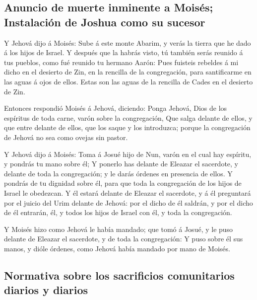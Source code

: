 \hypertarget{anuncio-de-muerte-inminente-a-moisuxe9s-instalaciuxf3n-de-joshua-como-su-sucesor}{%
\subsection{Anuncio de muerte inminente a Moisés; Instalación de Joshua
como su
sucesor}\label{anuncio-de-muerte-inminente-a-moisuxe9s-instalaciuxf3n-de-joshua-como-su-sucesor}}

 Y Jehová dijo á Moisés: Sube á este monte Abarim, y verás
la tierra que he dado á los hijos de Israel.  Y después que
la habrás visto, tú también serás reunido á tus pueblos, como fué
reunido tu hermano Aarón:  Pues fuisteis rebeldes á mi
dicho en el desierto de Zin, en la rencilla de la congregación, para
santificarme en las aguas á ojos de ellos. Estas son las aguas de la
rencilla de Cades en el desierto de Zin.

 Entonces respondió Moisés á Jehová, diciendo:
 Ponga Jehová, Dios de los espíritus de toda carne, varón
sobre la congregación,  Que salga delante de ellos, y que
entre delante de ellos, que los saque y los introduzca; porque la
congregación de Jehová no sea como ovejas sin pastor.

 Y Jehová dijo á Moisés: Toma á Josué hijo de Nun, varón en
el cual hay espíritu, y pondrás tu mano sobre él;  Y
ponerlo has delante de Eleazar el sacerdote, y delante de toda la
congregación; y le darás órdenes en presencia de ellos.  Y
pondrás de tu dignidad sobre él, para que toda la congregación de los
hijos de Israel le obedezcan.  Y él estará delante de
Eleazar el sacerdote, y á él preguntará por el juicio del Urim delante
de Jehová: por el dicho de él saldrán, y por el dicho de él entrarán,
él, y todos los hijos de Israel con él, y toda la congregación.

 Y Moisés hizo como Jehová le había mandado; que tomó á
Josué, y le puso delante de Eleazar el sacerdote, y de toda la
congregación:  Y puso sobre él sus manos, y dióle órdenes,
como Jehová había mandado por mano de Moisés.

\hypertarget{normativa-sobre-los-sacrificios-comunitarios-diarios-y-diarios}{%
\subsection{Normativa sobre los sacrificios comunitarios diarios y
diarios}\label{normativa-sobre-los-sacrificios-comunitarios-diarios-y-diarios}}

